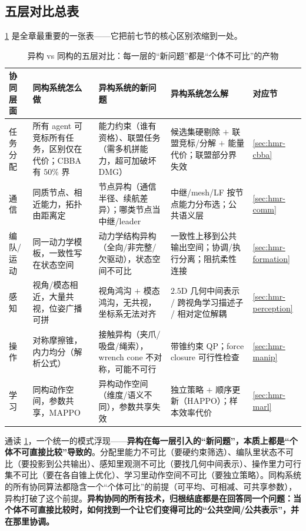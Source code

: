 \subsection{五层对比总表}
\label{sec:hmr-bound-table}
\cref{tab:hmr-five-layer} 是全章最重要的一张表——它把前七节的核心区别浓缩到一处。

\begin{table}[H]\centering\footnotesize
\caption{异构 vs 同构的五层对比：每一层的“新问题”都是“个体不可比”的产物}
\label{tab:hmr-five-layer}
\begin{tabular}{p{1.5cm}p{2.6cm}p{3.3cm}p{3.0cm}p{0.9cm}}
\toprule
协同层面 & 同构系统怎么做 & 异构系统的\textbf{新问题} & 异构系统怎么解 & 对应节 \\
\midrule
任务分配 & 所有 agent 可竞标所有任务，区别仅在代价；CBBA 有 $50\%$ 界 & 能力约束（谁有资格）、联盟任务（需多机拼能力，超可加破坏 DMG） & 候选集硬剔除 $+$ 联盟竞标/分解 $+$ 能量代价；联盟部分界失效 & \cref{sec:hmr-cbba} \\
通信 & 同质节点、相近能力，拓扑由距离定 & 节点异构（通信半径、续航差异）；哪类节点当中继/leader & 中继/mesh/LF 按节点能力分布选；公共语义层 & \cref{sec:hmr-comm} \\
编队/运动 & 同一动力学模板，一致性写在状态空间 & 动力学结构异构（全向/非完整/欠驱动），状态空间不可比 & 一致性上移到公共输出空间；协调/执行分离；阻抗柔性连接 & \cref{sec:hmr-formation} \\
感知 & 视角/模态相近，大量共视，位姿广播可拼 & 视角鸿沟 $+$ 模态鸿沟，无共视，坐标系无法对齐 & $2.5\mathrm{D}$ 几何中间表示 / 跨视角学习描述子 / 相对定位解耦 & \cref{sec:hmr-perception} \\
操作 & 对称摩擦锥，内力均分（解析公式） & 接触异构（夹爪/吸盘/绳索），wrench cone 不对称，可能不可行 & 带锥约束 QP；force closure 可行性检查 & \cref{sec:hmr-manip} \\
学习 & 同构动作空间，参数共享，MAPPO & 异构动作空间（维度/语义不同），参数共享失效 & 独立策略 $+$ 顺序更新（HAPPO）；样本效率代价 & \cref{sec:hmr-marl} \\
\bottomrule
\end{tabular}
\end{table}

\begin{insight}
通读 \cref{tab:hmr-five-layer}，一个统一的模式浮现——\textbf{异构在每一层引入的“新问题”，本质上都是“个体不可直接比较”导致的}。分配里能力不可比（要硬约束筛选）、编队里状态不可比（要投影到公共输出）、感知里观测不可比（要找几何中间表示）、操作里力可行集不可比（要在各自锥上优化）、学习里动作空间不可比（要独立策略）。同构系统的所有协同算法都隐含一个“个体可比”的前提（可平均、可相减、可共享参数），异构打破了这个前提。\textbf{异构协同的所有技术，归根结底都是在回答同一个问题：当个体不可直接比较时，如何找到一个让它们变得可比的“公共空间/公共表示”，并在那里协调。}
\end{insight}

